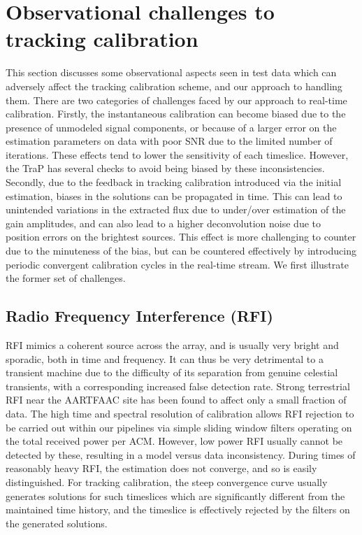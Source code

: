 \documentclass{aa}
\begin{document}
\section{\label{sec:Challenges-to-tracking}Observational challenges to tracking calibration}
This section  discusses some observational aspects  seen in test  data which can
adversely affect the  tracking calibration scheme, and our  approach to handling
them.  There are two categories of challenges faced by our approach to real-time
calibration. Firstly, the instantaneous calibration can become biased due to the
presence of  unmodeled signal components,  or because of  a larger error  on the
estimation  parameters on  data  with poor  SNR  due to  the  limited number  of
iterations.   These effects  tend to  lower the  sensitivity of  each timeslice.
However,  the  TraP   has  several  checks  to  avoid   being  biased  by  these
inconsistencies.   Secondly,  due  to   the  feedback  in  tracking  calibration
introduced via the initial estimation, biases in the solutions can be propagated
in time.   This can lead to unintended  variations in the extracted  flux due to
under/over estimation  of the  gain amplitudes,  and can also  lead to  a higher
deconvolution noise due to position errors on the brightest sources. This effect
is more  challenging to counter due  to the minuteness  of the bias, but  can be
countered effectively  by introducing periodic convergent  calibration cycles in
the real-time stream. We first illustrate the former set of challenges.

\subsection{Radio Frequency Interference (RFI)}

RFI mimics  a coherent source across the  array, and is usually  very bright and
sporadic,  both in time  and frequency.  It can  thus be  very detrimental  to a
transient machine due to the difficulty of its separation from genuine celestial
transients,  with  a  corresponding  increased  false  detection  rate.   Strong
terrestrial RFI  near the \mbox{AARTFAAC} site  has been found to  affect only a
small fraction  of data.  The high time  and spectral resolution  of calibration
allows RFI rejection  to be carried out within our  pipelines via simple sliding
window  filters operating on  the total  received power  per ACM.   However, low
power RFI usually cannot be detected  by these, resulting in a model versus data
inconsistency.  During  times of reasonably  heavy RFI, the estimation  does not
converge, and so  is easily distinguished.  For tracking  calibration, the steep
convergence  curve usually  generates solutions  for such  timeslices  which are
significantly different from  the maintained time history, and  the timeslice is
effectively rejected by the filters on the generated solutions.
\end{document}
